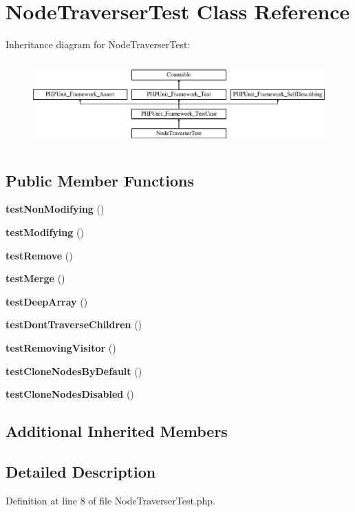 \section{Node\+Traverser\+Test Class Reference}
\label{class_php_parser_1_1_node_traverser_test}
Inheritance diagram for Node\+Traverser\+Test\+:\begin{figure}[H]
\begin{center}
\leavevmode
\includegraphics[height=3.303835cm]{class_php_parser_1_1_node_traverser_test}
\end{center}
\end{figure}
\subsection*{Public Member Functions}
\begin{DoxyCompactItemize}
\item 
{\bf test\+Non\+Modifying} ()
\item 
{\bf test\+Modifying} ()
\item 
{\bf test\+Remove} ()
\item 
{\bf test\+Merge} ()
\item 
{\bf test\+Deep\+Array} ()
\item 
{\bf test\+Dont\+Traverse\+Children} ()
\item 
{\bf test\+Removing\+Visitor} ()
\item 
{\bf test\+Clone\+Nodes\+By\+Default} ()
\item 
{\bf test\+Clone\+Nodes\+Disabled} ()
\end{DoxyCompactItemize}
\subsection*{Additional Inherited Members}


\subsection{Detailed Description}


Definition at line 8 of file Node\+Traverser\+Test.\+php.




